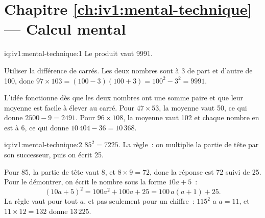 \section*{Chapitre \ref{ch:iv1:mental-technique} --- Calcul mental}

\begin{solution}{iq:iv1:mental-technique:1}
Le produit vaut 9991.

Utiliser la différence de carrés. Les deux nombres sont à 3 de part et d'autre de 100, donc $97 \times 103 = (100 - 3)(100 + 3) = 100^2 - 3^2 = 9991$.

L'idée fonctionne dès que les deux nombres ont une somme paire et que leur moyenne est facile à élever au carré. Pour $47 \times 53$, la moyenne vaut 50, ce qui donne $2500 - 9 = 2491$. Pour $96 \times 108$, la moyenne vaut 102 et chaque nombre en est à 6, ce qui donne $10\,404 - 36 = 10\,368$.

\end{solution}

\begin{solution}{iq:iv1:mental-technique:2}
$85^2 = 7225$. La règle~: on multiplie la partie de tête par son successeur, puis on écrit 25.

Pour 85, la partie de tête vaut 8, et $8 \times 9 = 72$, donc la réponse est 72 suivi de 25. Pour le démontrer, on écrit le nombre sous la forme $10a + 5$~:
\[
(10a + 5)^2 = 100a^2 + 100a + 25 = 100\,a(a + 1) + 25.
\]
La règle vaut pour tout $a$, et pas seulement pour un chiffre~: $115^2$ a $a = 11$, et $11 \times 12 = 132$ donne $13\,225$.

\end{solution}


